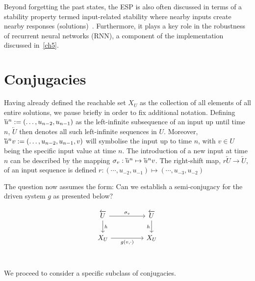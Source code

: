 Beyond forgetting the past states, the ESP is also often discussed in terms of a stability property termed input-related stability where nearby inputs create nearby responses (solutions)~\cite{manjunath2020stability}. 
Furthermore, it plays a key role in the robustness of recurrent neural networks (RNN), a component of the implementation discussed in~\ref{ch5}.

\section{Conjugacies}

Having already defined the reachable set $X_U$ as the collection of all elements of all entire solutions, we pause briefly in order to fix additional notation.
Defining $\cev{u}^{n}:=(\ldots,u_{n-2} ,u_{n-1})$ as the left-infinite subsequence of an input up until time $n$, $\overleftarrow{U}$ then denotes all such left-infinite sequences in $U$. 
Moreover, $\cev{u}^{n}v:=(\ldots,u_{n-2} ,u_{n-1}, v)$ will symbolise the input up to time $n$, with $v \in U$ being the specific input value at time $n$. 
The introduction of a new input at time $n$ can be described by the mapping $\sigma_v:   \cev{u}^{n} \mapsto \cev{u}^{n}v$. 
The right-shift map, $r\overleftarrow{U}\to\overleftarrow{U}$, of an input sequence is defined $r: (\cdots, u_{-2},u_{-1}) \mapsto(\cdots, u_{-3},u_{-2})$

The question now assumes the form: Can we establish a semi-conjugacy for the driven system $g$ as presented below?

  \begin{equation}\label{Scomm_h}
    \begin{tikzcd}
	{\overleftarrow{U}} && {\overleftarrow{U}} \\
	{X_U} && {X_U} \\
	\arrow["{\sigma_v}", from=1-1, to=1-3]
	\arrow["h"', from=1-3, to=2-3]
	\arrow["h", from=1-1, to=2-1]
	\arrow["{g(v,\cdot)}"', from=2-1, to=2-3]
\end{tikzcd}
\end{equation}

We proceed to consider a specific subclass of conjugacies.

